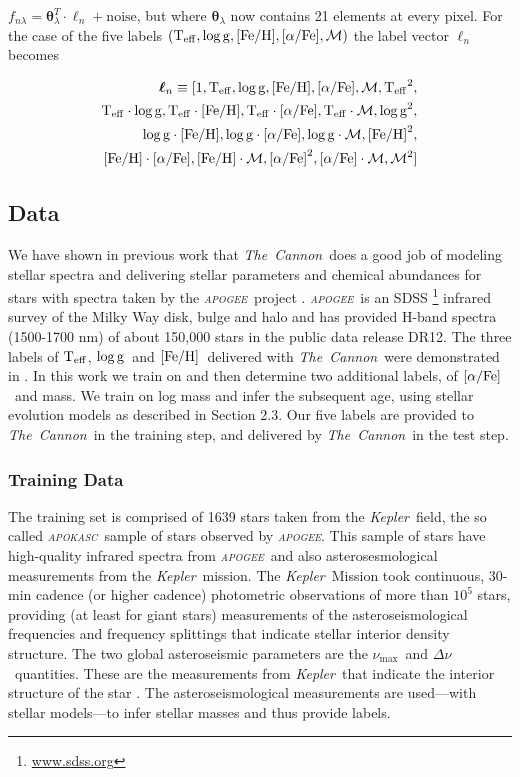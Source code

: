 \documentclass[12pt, preprint]{aastex}
\newcommand{\project}[1]{\textsl{#1}}
\newcommand{\tc}{\project{The~Cannon}}
\newcommand{\apogee}{\project{\textsc{apogee}}}
\newcommand{\apokasc}{\project{\textsc{apokasc}}}
\newcommand{\kepler}{\project{Kepler}}
\newcommand{\teff}{\mbox{$\rm T_{eff}$}}
\newcommand{\feh}{\mbox{$\rm [Fe/H]$}}
\newcommand{\alphafe}{\mbox{$\rm [\alpha/Fe]$}}
\newcommand{\logg}{\mbox{$\rm \log g$}}
\newcommand{\set}[1]{\bm{#1}}
\newcommand{\starlabel}{\ell}
\newcommand{\starlabelvec}{\set{\starlabel}}
\newcommand{\numax}{$\nu_{\max}$}
\newcommand{\deltanu}{$\Delta\nu$}
\begin{document}
$f_{n\lambda} =
\set{\theta}_\lambda^T \cdot \starlabelvec_n + \mbox{noise}$, 
but where $\set{\theta}_\lambda$ now contains 21 elements at every pixel. For the case of the five labels $(\teff , \logg , \feh, \alphafe, \mathcal{M})$ the label vector $\starlabelvec_n$
becomes  

\begin{equation}
\begin{split}
\starlabelvec_n \equiv  [1, \teff, \logg, \feh, \alphafe, \mathcal{M}, \teff^2, \\
 \teff\cdot\logg, \teff\cdot\feh, \teff\cdot\alphafe, \teff\cdot \mathcal{M},  \logg^2, \\
  \logg\cdot\feh, \logg\cdot\alphafe, \logg\cdot \mathcal{M}, \feh^2, \\
  \feh\cdot\alphafe, \feh\cdot \mathcal{M}, \alphafe^2, \alphafe\cdot\mathcal{M}, \mathcal{M}^2]
\end{split}
 \label{eq:quad}
\end{equation}


\subsection{Data}

We have shown in previous work \citep{Ness2015} that \tc\ does a good job
of modeling stellar spectra and delivering stellar parameters and
chemical abundances for stars with spectra taken by the \apogee\ project \citep{Majewski2012}.  \apogee\ is an SDSS \footnote{\url{www.sdss.org}}  \citep{E2011} infrared survey of the Milky Way disk, bulge and halo and has provided H-band spectra (1500-1700 nm) of about 150,000 stars in the public data release DR12.  
The three labels of \teff, \logg\ and \feh\ delivered with \tc\ were demonstrated in \citet{Ness2015}.  In this work we train on and then determine two additional labels, of \alphafe\ and mass. We train on log mass and infer the subsequent age, using stellar evolution models as described in Section 2.3. Our five labels are provided to \tc\ in the training step, and delivered by \tc\ in the test step.

\subsubsection{Training Data} 


 The training set is comprised of 1639 stars taken from the \kepler\ field, the so called \apokasc\ sample \citep{P2014}  of stars observed by \apogee.
This sample of stars have high-quality infrared
spectra from \apogee\ and also asterosesmological measurements from the \kepler\ mission.
The \kepler\ Mission \citep{B2010} took continuous, 30-min cadence (or
higher cadence) photometric observations of more than $10^5$ stars,
providing (at least for giant stars) measurements of the
asteroseismological frequencies and frequency splittings that indicate
stellar interior density structure.
The two global asteroseismic parameters are the \numax\ and \deltanu\ quantities. These are the measurements from \kepler\ that indicate the interior structure of the star \citep[see][and references therein]{P2014}.
The asteroseismological measurements are used---with stellar models---to infer stellar masses and thus provide labels.
\end{document}
